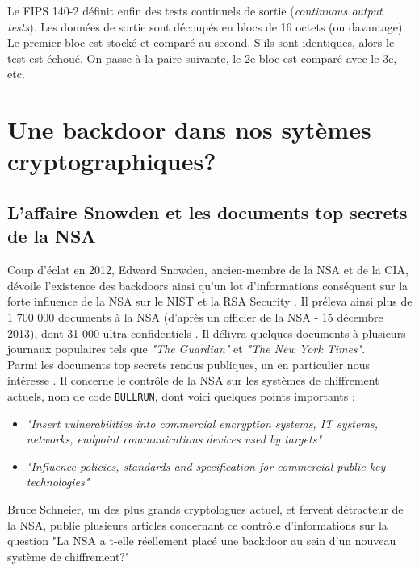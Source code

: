 		
		Le FIPS 140-2 définit enfin des tests continuels de sortie (\textit{continuous output tests}). Les données de sortie sont découpés en blocs de 16 octets (ou davantage). Le premier bloc est stocké et comparé au second. S'ils sont identiques, alors le test est échoué. On passe à la paire suivante, le 2e bloc est comparé avec le 3e, etc.

\section{Une backdoor dans nos sytèmes cryptographiques?}

	\subsection{L'affaire Snowden et les documents top secrets de la NSA}
	
	Coup d'éclat en 2012, Edward Snowden, ancien-membre de la NSA et de la CIA,	dévoile l'existence des backdoors ainsi qu'un lot d'informations conséquent sur la forte influence de la NSA sur le NIST et la RSA Security \cite{snowden2013reuters}.	Il préleva ainsi plus de 1 700 000 documents à la NSA (d'après un officier de la NSA - 15 décembre 2013), dont 31 000 ultra-confidentiels \cite{wikiSnowden}.	Il délivra quelques documents à plusieurs journaux populaires tels que \textit{"The Guardian"} et \textit{"The New York Times"}.\\
	
	
	Parmi les documents top secrets rendus publiques, un en particulier nous intéresse \cite{topsecretNSA}. Il concerne le contrôle de la NSA sur les systèmes de chiffrement actuels, nom de code \texttt{BULLRUN}, dont voici quelques points importants :\\ 
	\begin{itemize}
		\item \textit{"Insert vulnerabilities into commercial encryption systems, IT systems, networks, endpoint communications devices used by targets"}
		\item \textit{"Influence policies, standards and specification for commercial public key technologies"}\\
	\end{itemize}
	
	Bruce Schneier, un des plus grands cryptologues actuel, et fervent détracteur de la NSA, publie plusieurs articles concernant ce contrôle d'informations sur la question "La NSA a t-elle réellement placé une backdoor au sein d'un nouveau système de chiffrement?" \cite{schneier2007NSA} \\

